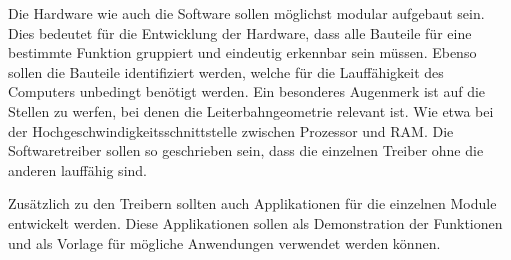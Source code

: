 Die Hardware wie auch die Software sollen möglichst modular aufgebaut sein. Dies bedeutet für die Entwicklung der Hardware, dass alle Bauteile für eine bestimmte Funktion gruppiert und eindeutig erkennbar sein müssen. Ebenso sollen die Bauteile identifiziert werden, welche für die Lauffähigkeit des Computers unbedingt benötigt werden. Ein besonderes Augenmerk ist auf die Stellen zu werfen, bei denen die Leiterbahngeometrie relevant ist. Wie etwa bei der Hochgeschwindigkeitsschnittstelle zwischen Prozessor und RAM. Die Softwaretreiber sollen so geschrieben sein, dass die einzelnen Treiber ohne die anderen lauffähig sind. 

Zusätzlich zu den Treibern sollten auch Applikationen für die einzelnen Module entwickelt werden. Diese Applikationen sollen als Demonstration der Funktionen und als Vorlage für mögliche Anwendungen verwendet werden können.
